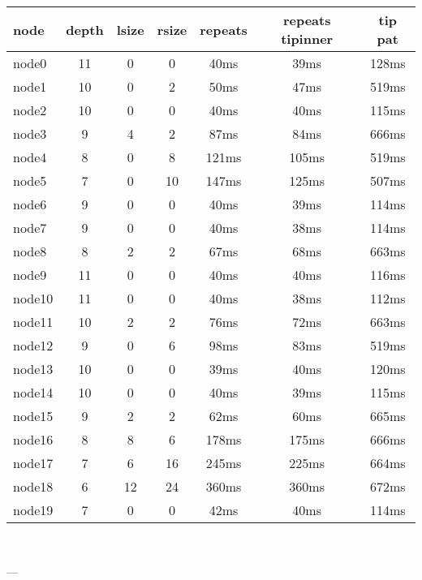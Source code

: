 

\begin{tabular}{|l|c|c|c|c|c|c|}
\hline node & depth & lsize & rsize  & repeats & repeats tipinner & tip pat\\
    \hline node0 & 11 & 0 & 0 & 40ms & 39ms & 128ms\\
    \hline node1 & 10 & 0 & 2 & 50ms & 47ms & 519ms\\
    \hline node2 & 10 & 0 & 0 & 40ms & 40ms & 115ms\\
    \hline node3 & 9 & 4 & 2 & 87ms & 84ms & 666ms\\
    \hline node4 & 8 & 0 & 8 & 121ms & 105ms & 519ms\\
    \hline node5 & 7 & 0 & 10 & 147ms & 125ms & 507ms\\
    \hline node6 & 9 & 0 & 0 & 40ms & 39ms & 114ms\\
    \hline node7 & 9 & 0 & 0 & 40ms & 38ms & 114ms\\
    \hline node8 & 8 & 2 & 2 & 67ms & 68ms & 663ms\\
    \hline node9 & 11 & 0 & 0 & 40ms & 40ms & 116ms\\
    \hline node10 & 11 & 0 & 0 & 40ms & 38ms & 112ms\\
    \hline node11 & 10 & 2 & 2 & 76ms & 72ms & 663ms\\
    \hline node12 & 9 & 0 & 6 & 98ms & 83ms & 519ms\\
    \hline node13 & 10 & 0 & 0 & 39ms & 40ms & 120ms\\
    \hline node14 & 10 & 0 & 0 & 40ms & 39ms & 115ms\\
    \hline node15 & 9 & 2 & 2 & 62ms & 60ms & 665ms\\
    \hline node16 & 8 & 8 & 6 & 178ms & 175ms & 666ms\\
    \hline node17 & 7 & 6 & 16 & 245ms & 225ms & 664ms\\
    \hline node18 & 6 & 12 & 24 & 360ms & 360ms & 672ms\\
    \hline node19 & 7 & 0 & 0 & 42ms & 40ms & 114ms\\

\hline
\end{tabular} \

---


